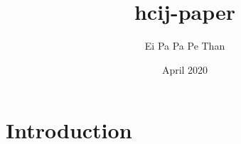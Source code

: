 \documentclass{article}
\title{hcij-paper}
\author{Ei Pa Pa Pe Than}
\date{April 2020}
\begin{document}
\maketitle

\section{Introduction}
\end{document}
